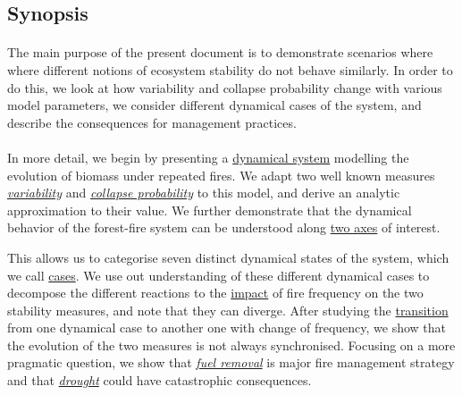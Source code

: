 \documentclass{article}
\begin{document}

\newpage

\subsection*{Synopsis}


\paragraph{}
The main purpose of the present document is to demonstrate scenarios where  where different notions of ecosystem stability do not behave similarly. In order to do this, we look at how variability and collapse probability change with various model parameters, we consider different dynamical cases of the system, and describe the consequences for management practices.

\paragraph{}
In more detail, we begin by presenting a \hyperref[dynamical_system]{dynamical system} modelling the evolution of biomass under repeated fires. We adapt two well known measures \hyperref[variability]{\textit{variability}} and \hyperref[collapse_probability]{\textit{collapse probability}} to this model, and derive an analytic approximation to their value. We further demonstrate that the dynamical behavior of the forest-fire system can be understood along \hyperref[axes_definition]{two axes} of interest.

This allows us to categorise seven distinct dynamical states of the system, which we call \hyperref[dyna_cases]{cases}. We use out understanding of these different dynamical cases to decompose the different reactions to the \hyperref[impact_freq]{impact} of fire frequency on the two stability measures, and note that they can diverge. After studying the \hyperref[transition]{transition} from one dynamical case to another one with change of frequency, we show that the evolution of the two measures is not always synchronised. Focusing on a more pragmatic question, we show that \hyperref[fuel_removal]{\textit{fuel removal}} is major fire management strategy and that \hyperref[drought]{\textit{drought}} could have catastrophic consequences.  
\end{document}
